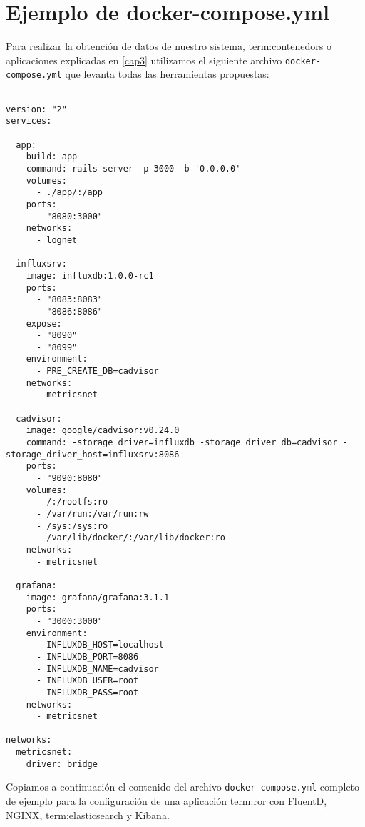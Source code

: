 \section{Ejemplo de docker-compose.yml}
\label{anexo:C}

Para realizar la obtención de datos de nuestro sistema, \glspl{term:contenedor} o
aplicaciones explicadas en \autoref{cap3} utilizamos el siguiente archivo
\texttt{docker-compose.yml} que levanta todas las herramientas propuestas:

\begin{lstlisting}

version: "2"
services:

  app:
    build: app
    command: rails server -p 3000 -b '0.0.0.0'
    volumes:
      - ./app/:/app
    ports:
      - "8080:3000"
    networks:
      - lognet

  influxsrv:
    image: influxdb:1.0.0-rc1
    ports:
      - "8083:8083"
      - "8086:8086"
    expose:
      - "8090"
      - "8099"
    environment:
      - PRE_CREATE_DB=cadvisor
    networks:
      - metricsnet

  cadvisor:
    image: google/cadvisor:v0.24.0
    command: -storage_driver=influxdb -storage_driver_db=cadvisor -storage_driver_host=influxsrv:8086
    ports:
      - "9090:8080"
    volumes:
      - /:/rootfs:ro
      - /var/run:/var/run:rw
      - /sys:/sys:ro
      - /var/lib/docker/:/var/lib/docker:ro
    networks:
      - metricsnet

  grafana:
    image: grafana/grafana:3.1.1
    ports:
      - "3000:3000"
    environment:
      - INFLUXDB_HOST=localhost
      - INFLUXDB_PORT=8086
      - INFLUXDB_NAME=cadvisor
      - INFLUXDB_USER=root
      - INFLUXDB_PASS=root
    networks:
      - metricsnet

networks:
  metricsnet:
    driver: bridge

\end{lstlisting}

Copiamos a continuación el contenido del archivo \texttt{docker-compose.yml}
completo de ejemplo para la configuración de una aplicación \gls{term:ror} con FluentD,
NGINX, \gls{term:elasticsearch} y Kibana.

